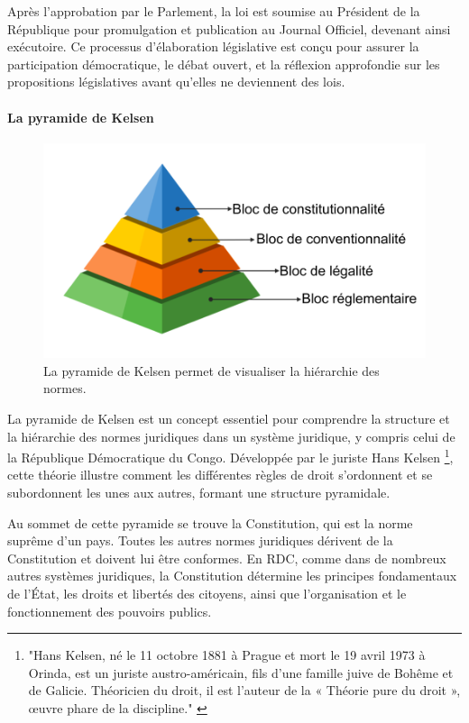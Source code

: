 Après l'approbation par le Parlement, la loi est soumise au Président de la République pour promulgation et publication au Journal Officiel, devenant ainsi exécutoire. Ce processus d'élaboration législative est conçu pour assurer la participation démocratique, le débat ouvert, et la réflexion approfondie sur les propositions législatives avant qu'elles ne deviennent des lois.

\paragraph{La pyramide de Kelsen \cite{Kelsen_Raphael_2024, Kelsen_jurixio_2023}} \hspace{0pt}

\begin{figure}[H]
    \centering
    \includegraphics[width=12cm]{gfx/fig-law-pyramide.png}
    \caption{La pyramide de Kelsen permet de visualiser la hiérarchie des normes. \cite{frwiki:212163472}}
    \label{fig:datagenerated}
\end{figure}

La pyramide de Kelsen est un concept essentiel pour comprendre la structure et la hiérarchie des normes juridiques dans un système juridique, y compris celui de la République Démocratique du Congo. Développée par le juriste Hans Kelsen \footnote{"Hans Kelsen, né le 11 octobre 1881 à Prague et mort le 19 avril 1973 à Orinda, est un juriste austro-américain, fils d'une famille juive de Bohême et de Galicie. Théoricien du droit, il est l'auteur de la « Théorie pure du droit », œuvre phare de la discipline." \cite{frwiki:213425509}}, cette théorie illustre comment les différentes règles de droit s'ordonnent et se subordonnent les unes aux autres, formant une structure pyramidale.

Au sommet de cette pyramide se trouve la Constitution, qui est la norme suprême d'un pays. Toutes les autres normes juridiques dérivent de la Constitution et doivent lui être conformes. En RDC, comme dans de nombreux autres systèmes juridiques, la Constitution détermine les principes fondamentaux de l'État, les droits et libertés des citoyens, ainsi que l'organisation et le fonctionnement des pouvoirs publics.

